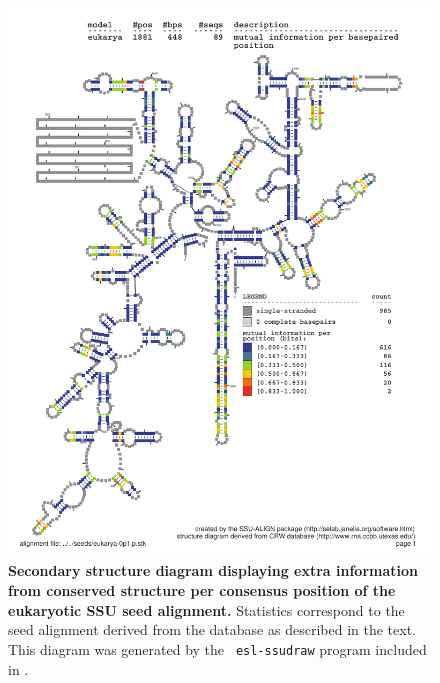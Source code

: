 \begin{figure}
\begin{center}
\includegraphics[width=5.7in]{Figures/eukarya-0p1-mutinfo}
\end{center}
\caption[Secondary structure diagram displaying extra information 
  from conserved structure per consensus position of the eukaryotic SSU seed
  alignment]{\textbf{Secondary structure diagram displaying extra
  information from conserved structure per consensus position of the eukaryotic SSU seed
  alignment.} Statistics correspond to the  seed
  alignment derived from the  database \cite{CannoneGutell02}
  as described in the text. This diagram was generated by the {\tt
  esl-ssudraw} program included in .}
\label{fig:euksinfo}
\end{figure}


